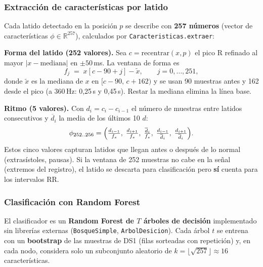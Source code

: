 \subsubsection{Extracción de características por latido}

Cada latido detectado en la posición $p$ se describe con \textbf{257 números} (vector de características $\phi\in\mathbb{R}^{257}$), calculados por \texttt{Caracteristicas.extraer}:

\textbf{Forma del latido (252 valores).} Sea $c=\mathrm{recentrar}(x,p)$ el pico R refinado al mayor $|x-\mathrm{mediana}|$ en $\pm 50$\,ms. La ventana de forma es
\begin{equation}
f_j \;=\; x[c-90+j]-\tilde{x},\qquad j=0,\dots,251,
\end{equation}
donde $\tilde{x}$ es la mediana de $x$ en $[c-90,\,c+162)$ y se usan 90 muestras antes y 162 desde el pico (a 360\,Hz: 0,25\,s y 0,45\,s). Restar la mediana elimina la línea base.

\textbf{Ritmo (5 valores).} Con $d_i=c_i-c_{i-1}$ el número de muestras entre latidos consecutivos y $\overline{d}_i$ la media de los últimos 10 $d$:
\begin{equation}
\phi_{252..256}=\Bigl(\tfrac{d_{i-1}}{f_s},\;\tfrac{d_{i+1}}{f_s},\;\tfrac{\overline{d}_i}{f_s},\;\tfrac{d_{i-1}}{\overline{d}_i},\;\tfrac{d_{i+1}}{\overline{d}_i}\Bigr).
\end{equation}
Estos cinco valores capturan latidos que llegan antes o después de lo normal (extrasístoles, pausas). Si la ventana de 252 muestras no cabe en la señal (extremos del registro), el latido se descarta para clasificación pero \textbf{sí} cuenta para los intervalos RR.

\subsubsection{Clasificación con Random Forest}

El clasificador es un \textbf{Random Forest de $T$ árboles de decisión} implementado sin librerías externas (\texttt{BosqueSimple}, \texttt{ArbolDesicion}). Cada árbol $t$ se entrena con un \textbf{bootstrap} de las muestras de DS1 (filas sorteadas con repetición) y, en cada nodo, considera solo un subconjunto aleatorio de $k=\lfloor\sqrt{257}\rfloor\approx 16$ características.

